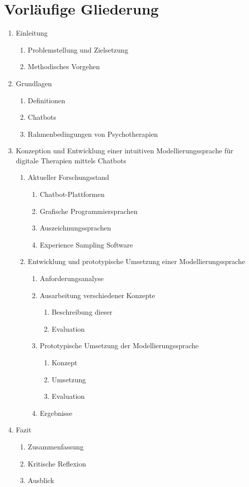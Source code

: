 
\section{Vorläufige Gliederung}
\label{ch:Gliederung}
\begin{enumerate} 
\item Einleitung
	\begin{enumerate}
	\item Problemstellung und Zielsetzung
	\item Methodisches Vorgehen
	\end{enumerate}
\item Grundlagen
	\begin{enumerate}
	\item Definitionen
	\item Chatbots
	\item Rahmenbedingungen von Psychotherapien
	\end{enumerate}
\item Konzeption und Entwicklung einer intuitiven Modellierungssprache für digitale Therapien mittels Chatbots
	\begin{enumerate}
	\item Aktueller Forschungsstand
		\begin{enumerate}
		\item Chatbot-Plattformen
		\item Grafische Programmiersprachen
		\item Auszeichnungssprachen
		\item Experience Sampling Software
		\end{enumerate}
	\item Entwicklung und prototypische Umsetzung einer Modellierungssprache
		\begin{enumerate}
		\item Anforderungsanalyse
		\item Ausarbeitung verschiedener Konzepte
			\begin{enumerate}
			\item Beschreibung dieser
			\item Evaluation
			\end{enumerate}
		\item Prototypische Umsetzung der Modellierungssprache
			\begin{enumerate}
			\item Konzept
			\item Umsetzung
			\item Evaluation
			\end{enumerate}
		\item Ergebnisse
		\end{enumerate}
	\end{enumerate}
\item Fazit
	\begin{enumerate}
	\item Zusammenfassung
	\item Kritische Reflexion
	\item Ausblick
	\end{enumerate}
\end{enumerate}

	